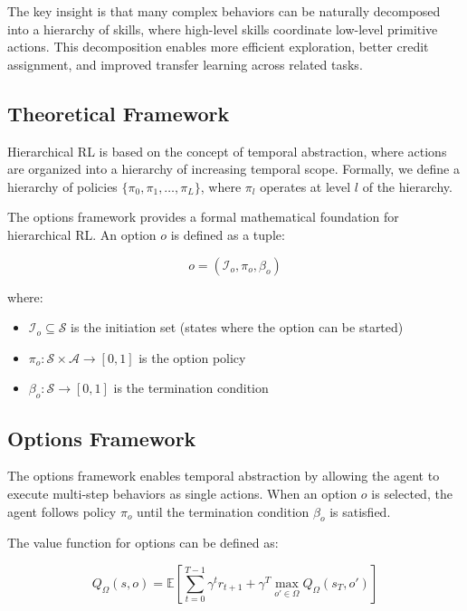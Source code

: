 \documentclass[12pt]{article}
\begin{document}
{{{The key insight is that many complex behaviors can be naturally decomposed into a hierarchy of skills, where high-level skills coordinate low-level primitive actions. This decomposition enables more efficient exploration, better credit assignment, and improved transfer learning across related tasks.

\subsection{Theoretical Framework}

Hierarchical RL is based on the concept of temporal abstraction, where actions are organized into a hierarchy of increasing temporal scope. Formally, we define a hierarchy of policies $\{\pi_0, \pi_1, \ldots, \pi_L\}$, where $\pi_l$ operates at level $l$ of the hierarchy.

The options framework provides a formal mathematical foundation for hierarchical RL. An option $o$ is defined as a tuple:

\begin{equation}
o = (\mathcal{I}_o, \pi_o, \beta_o)
\end{equation}

where:
\begin{itemize}
\item $\mathcal{I}_o \subseteq \mathcal{S}$ is the initiation set (states where the option can be started)
\item $\pi_o: \mathcal{S} \times \mathcal{A} \rightarrow [0,1]$ is the option policy
\item $\beta_o: \mathcal{S} \rightarrow [0,1]$ is the termination condition
\end{itemize}

\subsection{Options Framework}

The options framework enables temporal abstraction by allowing the agent to execute multi-step behaviors as single actions. When an option $o$ is selected, the agent follows policy $\pi_o$ until the termination condition $\beta_o$ is satisfied.

The value function for options can be defined as:

\begin{equation}
Q_\Omega(s,o) = \mathbb{E}\left[\sum_{t=0}^{T-1} \gamma^t r_{t+1} + \gamma^T \max_{o' \in \Omega} Q_\Omega(s_T, o') \right]
\end{equation}

}}}
\end{document}
